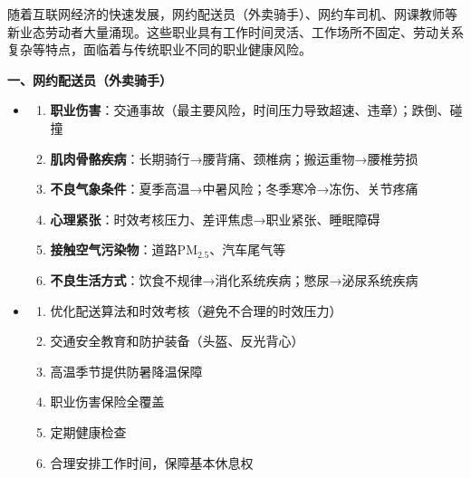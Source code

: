 \begin{keybox}
随着互联网经济的快速发展，网约配送员（外卖骑手）、网约车司机、网课教师等新业态劳动者大量涌现。这些职业具有工作时间灵活、工作场所不固定、劳动关系复杂等特点，面临着与传统职业不同的职业健康风险。

\textbf{一、网约配送员（外卖骑手）}
\begin{itemize}[leftmargin=*]
    \item {}
    \begin{enumerate}[leftmargin=*]
        \item \textbf{职业伤害}：交通事故（最主要风险，时间压力导致超速、违章）；跌倒、碰撞
        \item \textbf{肌肉骨骼疾病}：长期骑行→腰背痛、颈椎病；搬运重物→腰椎劳损
        \item \textbf{不良气象条件}：夏季高温→中暑风险；冬季寒冷→冻伤、关节疼痛
        \item \textbf{心理紧张}：时效考核压力、差评焦虑→职业紧张、睡眠障碍
        \item \textbf{接触空气污染物}：道路PM$_{2.5}$、汽车尾气等
        \item \textbf{不良生活方式}：饮食不规律→消化系统疾病；憋尿→泌尿系统疾病
    \end{enumerate}
    \item {}
    \begin{enumerate}[leftmargin=*]
        \item 优化配送算法和时效考核（避免不合理的时效压力）
        \item 交通安全教育和防护装备（头盔、反光背心）
        \item 高温季节提供防暑降温保障
        \item 职业伤害保险全覆盖
        \item 定期健康检查
        \item 合理安排工作时间，保障基本休息权
    \end{enumerate}
\end{itemize}


\end{keybox}
